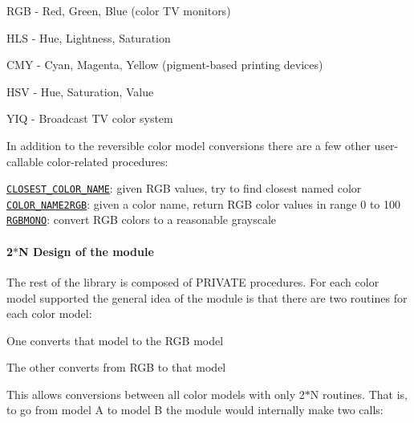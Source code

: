 \begin{DoxyDescription}
\begin{DoxyItemize}
\item R\+GB -\/ Red, Green, Blue (color TV monitors) 
\item H\+LS -\/ Hue, Lightness, Saturation 
\item C\+MY -\/ Cyan, Magenta, Yellow (pigment-\/based printing devices) 
\item H\+SV -\/ Hue, Saturation, Value 
\item Y\+IQ -\/ Broadcast TV color system 
\end{DoxyItemize}



In addition to the reversible color model conversions there are a few other user-\/callable color-\/related procedures\+: 




\begin{DoxyPre}\end{DoxyPre}



\begin{DoxyPre}    \href{closest_color_name.3.html}{\tt CLOSEST\_COLOR\_NAME}:  given RGB values, try to find closest named color
    \href{color_name2rgb.3.html}{\tt COLOR\_NAME2RGB}:  given a color name, return RGB color values in range 0 to 100
    \href{rgbmono.3.html}{\tt RGBMONO}:  convert RGB colors to a reasonable grayscale
 \end{DoxyPre}


\paragraph*{2$\ast$N Design of the module}





The rest of the library is composed of P\+R\+I\+V\+A\+TE procedures. For each color model supported the general idea of the module is that there are two routines for each color model\+: 




\begin{DoxyItemize}
\item One converts that model to the R\+GB model  
\item The other converts from R\+GB to that model  
\end{DoxyItemize}



This allows conversions between all color models with only 2$\ast$N routines. That is, to go from model A to model B the module would internally make two calls\+: 





\end{DoxyDescription}
